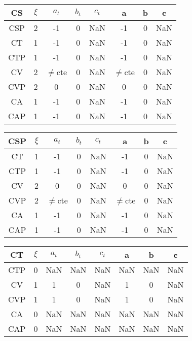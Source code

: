 \documentclass[twocolumn]{article}
\begin{document}
\begin{table}[H]
	\begin{tabular}{|c|c|c|c|c|c|c|c|}
		\hline
		CS & $\xi $& $a_t$ & $b_t$ & $c_t$ & a & b & c \\
		\hline
		CSP &  2 & -1  & 0  & NaN  & -1  & 0  &  NaN \\
		\hline
		CT & 1 & -1  & 0  &  NaN & -1  & 0  &  NaN\\
		\hline
		CTP & 1 & -1  & 0  & NaN  &  -1  &  0 & NaN  \\
		\hline
		CV & 2  & $\neq$cte  & 0  &  NaN & $\neq$cte  & 0  &  NaN   \\
		\hline
		CVP & 2  & 0  &  0 & NaN  & 0  & 0  &  NaN  \\
		\hline
		CA & 1 & -1  &  0 & NaN & -1  & 0  &  NaN  \\
		\hline
		CAP & 1 & -1  &  0 & NaN & -1  & 0  &  NaN \\
		\hline
	\end{tabular}
\end{table}

\begin{table}[H]
	\begin{tabular}{|c|c|c|c|c|c|c|c|}
		\hline
		CSP & $\xi $& $a_t$ & $b_t$ & $c_t$ & a & b & c \\
		\hline
		CT & 1 & -1  & 0 & NaN  & -1 & 0  &  NaN \\
		\hline
		CTP & 1 & -1  & 0 & NaN  & -1 & 0  &  NaN \\
		\hline
		CV &  2 &  0 &  0 & NaN & 0  & 0  &  NaN \\
		\hline
		CVP & 2  & $\neq$cte & 0  & NaN  & $\neq$cte  & 0  &  NaN \\
		\hline
		CA & 1 & -1 & 0  & NaN  & -1 & 0   &  NaN \\
		\hline
		CAP & 1 & -1  & 0  & NaN  & -1 & 0 &  NaN \\
		\hline
	\end{tabular}
\end{table}

\begin{table}[H]
	\begin{tabular}{|c|c|c|c|c|c|c|c|}
		\hline
		CT & $\xi $& $a_t$ & $b_t$ & $c_t$ & a & b & c \\
		\hline
		CTP & 0 & NaN  & NaN  & NaN & NaN  & NaN  & NaN\\
		\hline
		CV & 1 &  1 & 0  &  NaN & 1 & 0  & NaN  \\
		\hline
		CVP & 1 & 1  & 0  &  NaN & 1 & 0  & NaN   \\
		\hline
		CA & 0 & NaN  & NaN  & NaN  & NaN  & NaN  & NaN \\
		\hline
		CAP & 0 & NaN  & NaN  &  NaN & NaN  & NaN  & NaN \\
		\hline
	\end{tabular}
\end{table}
\end{document}
